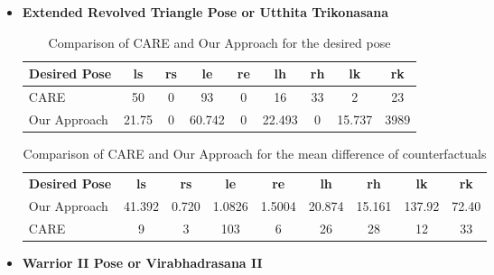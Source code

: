 \begin{itemize}
\item \textbf{Extended Revolved Triangle Pose or Utthita Trikonasana} \newline
\begin{table}[h!]
\centering
\begin{tabular}{|>{\centering\arraybackslash}m{4cm}|c|c|c|c|c|c|c|c|}
\hline
\rowcolor[HTML]{E6E6FA}  
\textbf{Desired Pose} & \textbf{ls} & \textbf{rs} & \textbf{le} & \textbf{re} & \textbf{lh} & \textbf{rh} & \textbf{lk} & \textbf{rk} \\ \hline
CARE & 50 & 0 & 93 & 0 & 16 & 33 & 2 & 23 \\ \hline
Our Approach & 21.75 & 0 & 60.742 & 0 & 22.493 & 0 & 15.737 & 3989 \\ \hline
\end{tabular}
\caption{Comparison of CARE and Our Approach for the desired pose}
\end{table}

\begin{table}[h!]
\centering
\begin{tabular}{|>{\centering\arraybackslash}m{4cm}|c|c|c|c|c|c|c|c|}
\hline
\rowcolor[HTML]{E6E6FA} %
\multicolumn{9}{|c|}{\textbf{Mean of difference of Counterfactuals}} \\ \hline
\rowcolor[HTML]{E6E6FA} %
\textbf{Desired Pose} & \textbf{ls} & \textbf{rs} & \textbf{le} & \textbf{re} & \textbf{lh} & \textbf{rh} & \textbf{lk} & \textbf{rk} \\ \hline
Our Approach & 41.392 & 0.720 & 1.0826 & 1.5004 & 20.874 & 15.161 & 137.92 & 72.40 \\ \hline
CARE & 9 & 3 & 103 & 6 & 26 & 28 & 12 & 33 \\ \hline
\end{tabular}
\caption{Comparison of CARE and Our Approach for the mean difference of counterfactuals}
\end{table}

\item \textbf{Warrior II Pose or Virabhadrasana II} \newline


\end{itemize}
